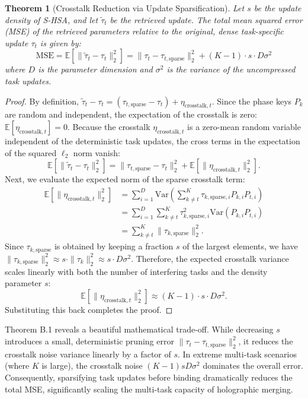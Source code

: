 \documentclass{article}
\theoremstyle{plain}
\newtheorem{theorem}{Theorem}[section]
\theoremstyle{definition}
\theoremstyle{remark}
\begin{document}
\begin{theorem}[Crosstalk Reduction via Update Sparsification]
Let $s$ be the update density of S-HSA, and let $\tilde{\tau}_t$ be the retrieved update. The total mean squared error (MSE) of the retrieved parameters relative to the original, dense task-specific update $\tau_t$ is given by:
\begin{equation}
    \text{MSE} = \mathbb{E}[\| \tilde{\tau}_t - \tau_t \|_2^2] = \| \tau_t - \tau_{t, \text{sparse}} \|_2^2 + (K - 1) \cdot s \cdot D \sigma^2
\end{equation}
where $D$ is the parameter dimension and $\sigma^2$ is the variance of the uncompressed task updates.
\end{theorem}
\begin{proof}
By definition, $\tilde{\tau}_t - \tau_t = (\tau_{t, \text{sparse}} - \tau_t) + \eta_{\text{crosstalk}, t}$. Since the phase keys $P_k$ are random and independent, the expectation of the crosstalk is zero: $\mathbb{E}[\eta_{\text{crosstalk}, t}] = 0$. Because the crosstalk $\eta_{\text{crosstalk}, t}$ is a zero-mean random variable independent of the deterministic task updates, the cross terms in the expectation of the squared $\ell_2$ norm vanish:
\begin{equation}
    \mathbb{E}[\| \tilde{\tau}_t - \tau_t \|_2^2] = \| \tau_{t, \text{sparse}} - \tau_t \|_2^2 + \mathbb{E}[\| \eta_{\text{crosstalk}, t} \|_2^2].
\end{equation}
Next, we evaluate the expected norm of the sparse crosstalk term:
\begin{align}
    \mathbb{E}[\| \eta_{\text{crosstalk}, t} \|_2^2] &= \sum_{i=1}^D \text{Var}\left( \sum_{k \neq t}^K \tau_{k,\text{sparse},i} P_{k,i} P_{t,i} \right) \nonumber \\
    &= \sum_{i=1}^D \sum_{k \neq t}^K \tau_{k,\text{sparse},i}^2 \text{Var}(P_{k,i} P_{t,i}) \nonumber \\
    &= \sum_{k \neq t}^K \| \tau_{k, \text{sparse}} \|_2^2.
\end{align}
Since $\tau_{k, \text{sparse}}$ is obtained by keeping a fraction $s$ of the largest elements, we have $\| \tau_{k, \text{sparse}} \|_2^2 \approx s \cdot \| \tau_k \|_2^2 \approx s \cdot D \sigma^2$. Therefore, the expected crosstalk variance scales linearly with both the number of interfering tasks and the density parameter $s$:
\begin{equation}
    \mathbb{E}[\| \eta_{\text{crosstalk}, t} \|_2^2] \approx (K-1) \cdot s \cdot D \sigma^2.
\end{equation}
Substituting this back completes the proof.
\end{proof}
Theorem B.1 reveals a beautiful mathematical trade-off. While decreasing $s$ introduces a small, deterministic pruning error $\| \tau_t - \tau_{t, \text{sparse}} \|_2^2$, it reduces the crosstalk noise variance linearly by a factor of $s$. In extreme multi-task scenarios (where $K$ is large), the crosstalk noise $(K-1)sD\sigma^2$ dominates the overall error. Consequently, sparsifying task updates before binding dramatically reduces the total MSE, significantly scaling the multi-task capacity of holographic merging.
\end{document}
